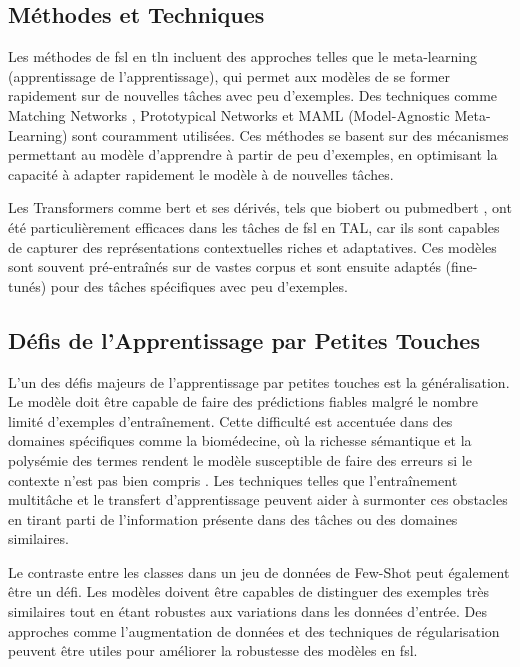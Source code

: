 \documentclass[12pt]{report}
\begin{document}
\subsection{Méthodes et Techniques}

Les méthodes de \gls{fsl} en \gls{tln} incluent des approches telles que le meta-learning (apprentissage de l'apprentissage), qui permet aux modèles de se former rapidement sur de nouvelles tâches avec peu d'exemples. Des techniques comme Matching Networks \cite{vinyals2016matching}, Prototypical Networks \cite{snell2017prototypical} et MAML (Model-Agnostic Meta-Learning) \cite{finn2017model} sont couramment utilisées. Ces méthodes se basent sur des mécanismes permettant au modèle d'apprendre à partir de peu d'exemples, en optimisant la capacité à adapter rapidement le modèle à de nouvelles tâches.

Les Transformers comme \gls{bert} \cite{devlin2019bert} et ses dérivés, tels que \gls{biobert} \cite{lee2020biobert} ou \gls{pubmedbert} \cite{lu2020pubmedbert}, ont été particulièrement efficaces dans les tâches de \gls{fsl} en TAL, car ils sont capables de capturer des représentations contextuelles riches et adaptatives. Ces modèles sont souvent pré-entraînés sur de vastes corpus et sont ensuite adaptés (fine-tunés) pour des tâches spécifiques avec peu d'exemples.

\subsection{Défis de l'Apprentissage par Petites Touches}

L'un des défis majeurs de l'apprentissage par petites touches est la généralisation. Le modèle doit être capable de faire des prédictions fiables malgré le nombre limité d'exemples d'entraînement. Cette difficulté est accentuée dans des domaines spécifiques comme la biomédecine, où la richesse sémantique et la polysémie des termes rendent le modèle susceptible de faire des erreurs si le contexte n'est pas bien compris \cite{jin2019recurrent, zhang2020biowordvec}. Les techniques telles que l'entraînement multitâche et le transfert d'apprentissage peuvent aider à surmonter ces obstacles en tirant parti de l'information présente dans des tâches ou des domaines similaires.

Le contraste entre les classes dans un jeu de données de Few-Shot peut également être un défi. Les modèles doivent être capables de distinguer des exemples très similaires tout en étant robustes aux variations dans les données d'entrée. Des approches comme l'augmentation de données et des techniques de régularisation peuvent être utiles pour améliorer la robustesse des modèles en \gls{fsl}. 
\end{document}

